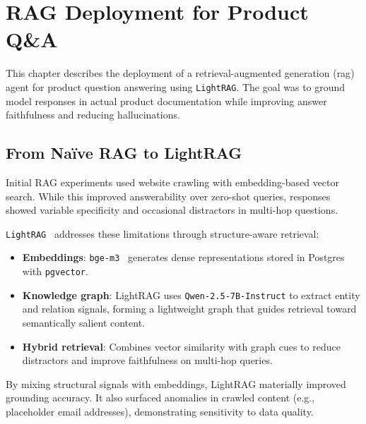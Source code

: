 \chapter{RAG Deployment for Product Q\&A}
\label{ch:RAGDeployment}

This chapter describes the deployment of a retrieval-augmented generation
(\gls{rag}) agent for product question answering using \texttt{LightRAG}. The
goal was to ground model responses in actual product documentation while
improving answer faithfulness and reducing hallucinations.

\section{From Naïve RAG to LightRAG}
\label{sec:RAG_Evolution}

Initial RAG experiments used website crawling with embedding-based vector
search. While this improved answerability over zero-shot queries, responses
showed variable specificity and occasional distractors in multi-hop questions.

\texttt{LightRAG}~\cite{guo2024lightrag} addresses these limitations through
structure-aware retrieval:

\begin{itemize}
    \item \textbf{Embeddings}: \texttt{bge-m3}~\cite{chen2024bge_m3} generates
          dense representations stored in Postgres with \texttt{pgvector}.
    \item \textbf{Knowledge graph}: LightRAG uses \texttt{Qwen-2.5-7B-Instruct}
          to extract entity and relation signals, forming a lightweight graph
          that guides retrieval toward semantically salient content.
    \item \textbf{Hybrid retrieval}: Combines vector similarity with graph cues
          to reduce distractors and improve faithfulness on multi-hop queries.
\end{itemize}

By mixing structural signals with embeddings, LightRAG materially improved
grounding accuracy. It also surfaced anomalies in crawled content (e.g.,
placeholder email addresses), demonstrating sensitivity to data quality.

